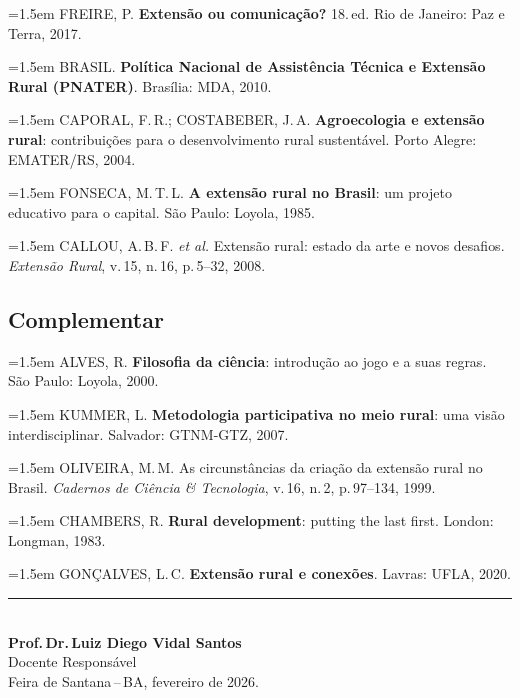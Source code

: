 \documentclass[11pt,a4paper]{article}
\begin{document}
\begin{small}
\hangindent=1.5em
FREIRE, P. \textbf{Extensão ou comunicação?} 18.\,ed. Rio de Janeiro: Paz e Terra, 2017.\par\medskip

\hangindent=1.5em
BRASIL. \textbf{Política Nacional de Assistência Técnica e Extensão Rural (PNATER)}. Brasília: MDA, 2010.\par\medskip

\hangindent=1.5em
CAPORAL, F.\,R.; COSTABEBER, J.\,A. \textbf{Agroecologia e extensão rural}: contribuições para o desenvolvimento rural sustentável. Porto Alegre: EMATER/RS, 2004.\par\medskip

\hangindent=1.5em
FONSECA, M.\,T.\,L. \textbf{A extensão rural no Brasil}: um projeto educativo para o capital. São Paulo: Loyola, 1985.\par\medskip

\hangindent=1.5em
CALLOU, A.\,B.\,F. \textit{et al.} Extensão rural: estado da arte e novos desafios. \textit{Extensão Rural}, v.\,15, n.\,16, p.\,5--32, 2008.\par\medskip
\end{small}

\subsection*{Complementar}

\begin{small}
\hangindent=1.5em
ALVES, R. \textbf{Filosofia da ciência}: introdução ao jogo e a suas regras. São Paulo: Loyola, 2000.\par\medskip

\hangindent=1.5em
KUMMER, L. \textbf{Metodologia participativa no meio rural}: uma visão interdisciplinar. Salvador: GTNM-GTZ, 2007.\par\medskip

\hangindent=1.5em
OLIVEIRA, M.\,M. As circunstâncias da criação da extensão rural no Brasil. \textit{Cadernos de Ciência \& Tecnologia}, v.\,16, n.\,2, p.\,97--134, 1999.\par\medskip

\hangindent=1.5em
CHAMBERS, R. \textbf{Rural development}: putting the last first. London: Longman, 1983.\par\medskip

\hangindent=1.5em
GONÇALVES, L.\,C. \textbf{Extensão rural e conexões}. Lavras: UFLA, 2020.\par\medskip
\end{small}



\vfill

\begin{center}
\noindent\rule{6cm}{0.4pt}\\[6pt]
\textbf{Prof.\,Dr.\,Luiz Diego Vidal Santos}\\
Docente Responsável\\[4pt]
{\small Feira de Santana\,--\,BA, fevereiro de 2026.}
\end{center}
\end{document}
